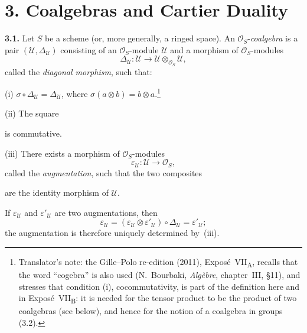 
\section*{3. Coalgebras and Cartier Duality}
\label{sga3:VIIA:3}

\medskip
\noindent\textbf{3.1.}
\label{sga3:VIIA:3.1}
Let \(S\) be a scheme (or, more generally, a ringed space). An
\(\mathcal O_S\)-\emph{coalgebra}
is a pair \((\mathcal U,\Delta_{\mathcal U})\) consisting of an
\(\mathcal O_S\)-module \(\mathcal U\) and a morphism of
\(\mathcal O_S\)-modules
\[
  \Delta_{\mathcal U}:\mathcal U\longrightarrow
  \mathcal U\otimes_{\mathcal O_S}\mathcal U,
\]
called the \emph{diagonal morphism}, such
that:

\smallskip
\noindent
(i) \(\sigma\circ\Delta_{\mathcal U}=\Delta_{\mathcal U}\), where
\(\sigma(a\otimes b)=b\otimes a\).\footnote{Translator's note: the
Gille--Polo re-edition (2011), Expos\'e~VII\textsubscript{A}, recalls that
the word ``cogebra'' is also used (N.~Bourbaki, \textit{Alg\`ebre},
chapter~III, \S11), and stresses that condition (i), cocommutativity, is
part of the definition here and in Expos\'e~VII\textsubscript{B}: it is
needed for the tensor product to be the product of two coalgebras (see
below), and hence for the notion of a coalgebra in groups (3.2).}

\smallskip
\noindent
(ii) The square
\begin{center}
  \label{sga3:VIIA:3.1-coassociativity-square}
  
\end{center}
is commutative.

\smallskip
\noindent
(iii) There exists a morphism of \(\mathcal O_S\)-modules
\[
  \varepsilon_{\mathcal U}:\mathcal U\longrightarrow\mathcal O_S,
\]
called the \emph{augmentation}, such that the two composites
\begin{center}
  \label{sga3:VIIA:3.1-augmentation-sequences}
  
\end{center}
are the identity morphism of \(\mathcal U\).

If \(\varepsilon_{\mathcal U}\) and
\(\varepsilon'_{\mathcal U}\) are two augmentations, then
\[
  \varepsilon_{\mathcal U}
  =(\varepsilon_{\mathcal U}\otimes\varepsilon'_{\mathcal U})
    \circ\Delta_{\mathcal U}
  =\varepsilon'_{\mathcal U};
\]
the augmentation is therefore uniquely determined by~(iii).

